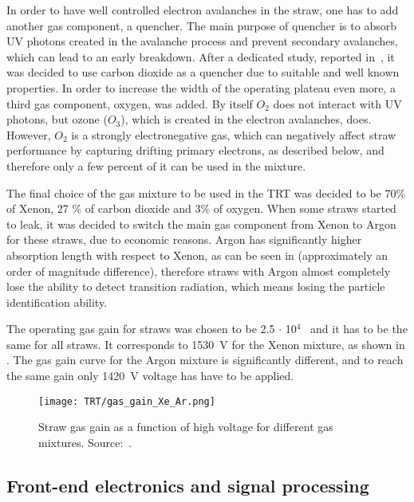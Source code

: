 In order to have well controlled electron avalanches in the straw, one has to add another gas component, a quencher. The main purpose of quencher is to absorb UV photons created in the avalanche process and prevent secondary avalanches, which can lead to an early breakdown.
After a dedicated study, reported in~\cite{Abat:2008zza}, it was decided to use carbon dioxide as a quencher due to suitable and well known properties.
In order to increase the width of the operating plateau even more, a third gas component, oxygen, was added.
By itself $O_2$ does not interact with UV photons, but ozone ($O_3$), which is created in the electron avalanches, does.
However, $O_2$ is a strongly electronegative gas, which can negatively affect straw performance by capturing drifting primary electrons, as described below,
and therefore only a few percent of it can be used in the mixture.
 
The final choice of the gas mixture to be used in the TRT was decided to be 70$\%$ of Xenon, 27 $\%$ of carbon dioxide and 3$\%$ of oxygen.
When some straws started to leak, it was decided to switch the main gas component from Xenon to Argon for these straws, due to economic reasons.
Argon has significantly higher absorption length with respect to Xenon, as can be seen in  (approximately an order of magnitude difference), 
therefore straws with Argon almost completely lose the ability to detect transition radiation, 
which means losing the particle identification ability.

The operating gas gain for straws was chosen to be 2.5 $\cdot$ 10$^4$~\cite{ID_TDR_vol1} and it has to be the same for all straws. It corresponds to 1530~V for the Xenon mixture, as shown in .
The gas gain curve for the Argon mixture is significantly different, and to reach the same gain only 1420~V voltage has have to be applied.

\begin{figure}
\centering
\texttt{[image: TRT/gas\_gain\_Xe\_Ar.png]}
\caption{ 
Straw gas gain as a function of high voltage for different gas mixtures. Source:~\cite{Abat:2008zza}.
}
\label{fig:gas_gain}
\end{figure}



\subsection{Front-end electronics and signal processing}
\label{subsubsec:front_end_electronics}

